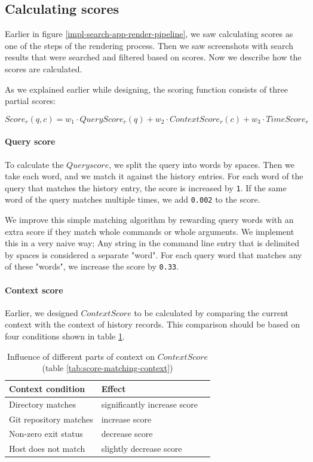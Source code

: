 \clearpage
\subsection{Calculating scores}

Earlier in figure \ref{impl-search-app-render-pipeline}, we saw calculating scores as one of the steps of the rendering process. Then we saw screenshots with search results that were searched and filtered based on scores. Now we describe how the scores are calculated.

As we explained earlier while designing, the scoring function consists of three partial scores:

\[ Score_r(q,c) = w_1 \cdot QueryScore_r(q) + w_2 \cdot ContextScore_r(c) + w_3 \cdot TimeScore_r \]


\paragraph{Query score}

To calculate the \(Query score\), we split the query into words by spaces. Then we take each word, and we match it against the history entries. For each word of the query that matches the history entry, the score is increased by \verb|1|. If the same word of the query matches multiple times, we add \verb|0.002| to the score. 


We improve this simple matching algorithm by rewarding query words with an extra score if they match whole commands or whole arguments. We implement this in a very naive way; Any string in the command line entry that is delimited by spaces is considered a separate "word". For each query word that matches any of these "words", we increase the score by \verb|0.33|.

\paragraph{Context score}

Earlier, we designed \(ContextScore\) to be calculated by comparing the current context with the context of history records. This comparison should be based on four conditions shown in table \ref{tab:copy-of-score-matching-context}.

\begin{table}[h!]
\centering
\begin{tabular}{lll}
\hline \hline
Context condition & Effect \\
\hline
Directory matches & significantly increase score \\ 
Git repository matches & increase score \\ 
Non-zero exit status & decrease score \\
Host does not match & slightly decrease score \\ 
\hline \hline
\end{tabular}
\caption{Influence of different parts of context on \(ContextScore\) (table \ref{tab:score-matching-context})}
\label{tab:copy-of-score-matching-context}
\end{table}


